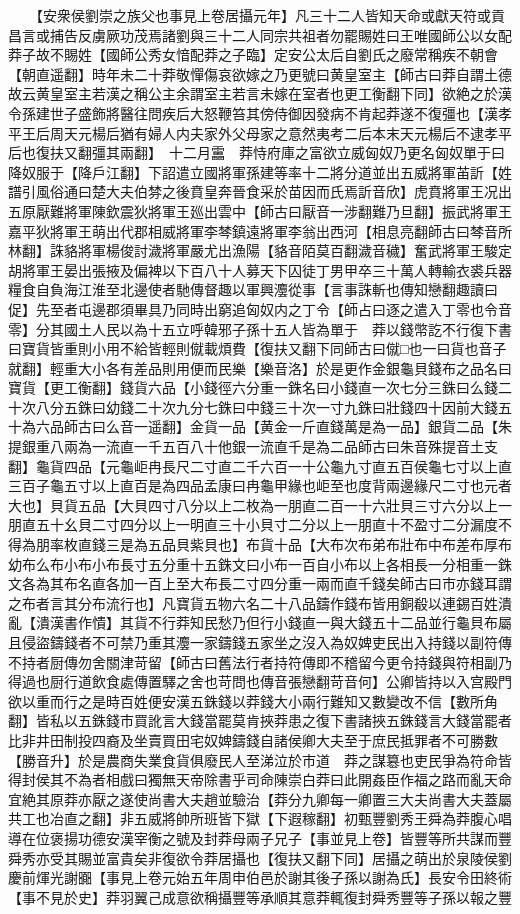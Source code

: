 　　【安衆侯劉崇之族父也事見上卷居攝元年】凡三十二人皆知天命或獻天符或貢昌言或捕告反虜厥功茂焉諸劉與三十二人同宗共祖者勿罷賜姓曰王唯國師公以女配莽子故不賜姓【國師公秀女愔配莽之子臨】定安公太后自劉氏之廢常稱疾不朝會【朝直遥翻】時年未二十莽敬憚傷哀欲嫁之乃更號曰黄皇室主【師古曰莽自謂土德故云黄皇室主若漢之稱公主余謂室主若言未嫁在室者也更工衡翻下同】欲絶之於漢令孫建世子盛飾將醫往問疾后大怒鞭笞其傍侍御因發病不肯起莽遂不復彊也【漢孝平王后周天元楊后猶有婦人内夫家外父母家之意然夷考二后本末天元楊后不逮孝平后也復扶又翻彊其兩翻】　十二月靁　莽恃府庫之富欲立威匈奴乃更名匈奴單于曰降奴服于【降戶江翻】下詔遣立國將軍孫建等率十二將分道並出五威將軍苖訢【姓譜引風俗通曰楚大夫伯棼之後賁皇奔晉食采於苗因而氏焉訢音欣】虎賁將軍王况出五原厭難將軍陳欽震狄將軍王廵出雲中【師古曰厭音一涉翻難乃旦翻】振武將軍王嘉平狄將軍王萌出代郡相威將軍李棽鎮遠將軍李翁出西河【相息亮翻師古曰棽音所林翻】誅貉將軍楊俊討濊將軍嚴尤出漁陽【貉音陌莫百翻濊音穢】奮武將軍王駿定胡將軍王晏出張掖及偏裨以下百八十人募天下囚徒丁男甲卒三十萬人轉輸衣裘兵器糧食自負海江淮至北邊使者馳傳督趣以軍興灋從事【言事誅斬也傳知戀翻趣讀曰促】先至者屯邊郡須畢具乃同時出窮追匈奴内之丁令【師占曰逐之遣入丁零也令音零】分其國土人民以為十五立呼韓邪子孫十五人皆為單于　莽以錢幣訖不行復下書曰寶貨皆重則小用不給皆輕則僦載煩費【復扶又翻下同師古曰僦□也一曰貨也音子就翻】輕重大小各有差品則用便而民樂【樂音洛】於是更作金銀龜貝錢布之品名曰寶貨【更工衡翻】錢貨六品【小錢徑六分重一銖名曰小錢直一次七分三銖曰么錢二十次八分五銖曰幼錢二十次九分七銖曰中錢三十次一寸九銖曰壯錢四十因前大錢五十為六品師古曰么音一遥翻】金貨一品【黄金一斤直錢萬是為一品】銀貨二品【朱提銀重八兩為一流直一千五百八十他銀一流直千是為二品師古曰朱音殊提音土支翻】龜貨四品【元龜岠冉長尺二寸直二千六百一十公龜九寸直五百侯龜七寸以上直三百子龜五寸以上直百是為四品孟康曰冉龜甲緣也岠至也度背兩邊緣尺二寸也元者大也】貝貨五品【大貝四寸八分以上二枚為一朋直二百一十六壯貝三寸六分以上一朋直五十幺貝二寸四分以上一明直三十小貝寸二分以上一朋直十不盈寸二分漏度不得為朋率枚直錢三是為五品貝紫貝也】布貨十品【大布次布弟布壯布中布差布厚布幼布么布小布小布長寸五分重十五銖文曰小布一百自小布以上各相長一分相重一銖文各為其布名直各加一百上至大布長二寸四分重一兩而直千錢矣師古曰市亦錢耳謂之布者言其分布流行也】凡寶貨五物六名二十八品鑄作錢布皆用銅殽以連錫百姓潰亂【潰漢書作憒】其貨不行莽知民愁乃但行小錢直一與大錢五十二品並行龜貝布屬且侵盜鑄錢者不可禁乃重其灋一家鑄錢五家坐之沒入為奴婢吏民出入持錢以副符傳不持者厨傳勿舍關津苛留【師古曰舊法行者持符傳即不稽留今更令持錢與符相副乃得過也厨行道飲食處傳置驛之舍也苛問也傳音張戀翻苛音何】公卿皆持以入宫殿門欲以重而行之是時百姓便安漢五銖錢以莽錢大小兩行難知又數變改不信【數所角翻】皆私以五銖錢市買訛言大錢當罷莫肯挾莽患之復下書諸挾五銖錢言大錢當罷者比非井田制投四裔及坐賣買田宅奴婢鑄錢自諸侯卿大夫至于庶民抵罪者不可勝數【勝音升】於是農商失業食貨俱廢民人至涕泣於市道　莽之謀簒也吏民爭為符命皆得封侯其不為者相戲曰獨無天帝除書乎司命陳崇白莽曰此開姦臣作福之路而亂天命宜絶其原莽亦厭之遂使尚書大夫趙並驗治【莽分九卿每一卿置三大夫尚書大夫蓋屬共工也冶直之翻】非五威將帥所班皆下獄【下遐稼翻】初甄豐劉秀王舜為莽腹心唱導在位褒揚功德安漢宰衡之號及封莽母兩子兄子【事並見上卷】皆豐等所共謀而豐舜秀亦受其賜並富貴矣非復欲令莽居攝也【復扶又翻下同】居攝之萌出於泉陵侯劉慶前煇光謝嚻【事見上卷元始五年周申伯邑於謝其後子孫以謝為氏】長安令田終術【事不見於史】莽羽翼己成意欲稱攝豐等承順其意莽輒復封舜秀豐等子孫以報之豐